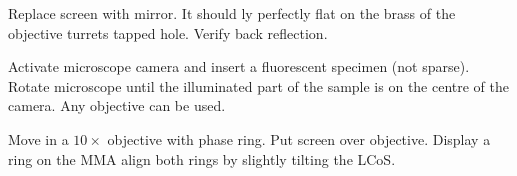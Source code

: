 \documentclass{scrartcl}
\begin{document}
Replace screen with mirror. It should ly perfectly flat on the brass of the
objective turrets tapped hole. Verify back reflection.

 Activate microscope camera
and insert a fluorescent specimen (not sparse).  Rotate microscope
until the illuminated part of the sample is on the centre of the
camera. Any objective can be used.

 Move in a $10\times$
objective with phase ring. Put screen over objective. Display a ring
on the MMA align both rings by slightly tilting the LCoS.
\end{document}
